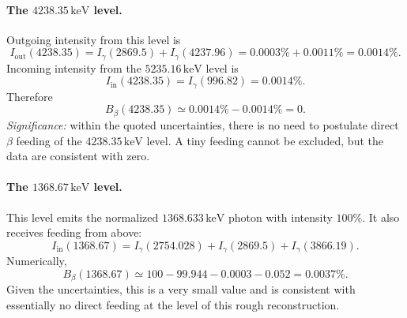 \paragraph{The $4238.35\,\text{keV}$ level.}
Outgoing intensity from this level is
\begin{equation}
  \label{eq:lec10:out_4238}
  I_\text{out}(4238.35)
  =
  I_\gamma(2869.5)+I_\gamma(4237.96)
  =
  0.0003\%+0.0011\%
  =
  0.0014\%.
\end{equation}
Incoming intensity from the $5235.16\,\text{keV}$ level is
\begin{equation}
  \label{eq:lec10:in_4238}
  I_\text{in}(4238.35)=I_\gamma(996.82)=0.0014\%.
\end{equation}
Therefore
\begin{equation}
  \label{eq:lec10:feed_4238}
  \boxed{
  B_\beta(4238.35)\simeq 0.0014\%-0.0014\%=0.}
\end{equation}
\textit{Significance:} within the quoted uncertainties, there is no need to
postulate direct $\beta$ feeding of the $4238.35\,\text{keV}$ level. A tiny
feeding cannot be excluded, but the data are consistent with zero.

\paragraph{The $1368.67\,\text{keV}$ level.}
This level emits the normalized $1368.633\,\text{keV}$ photon with intensity
$100\%$. It also receives feeding from above:
\begin{equation}
  \label{eq:lec10:in_1368}
  I_\text{in}(1368.67)
  =
  I_\gamma(2754.028)+I_\gamma(2869.5)+I_\gamma(3866.19).
\end{equation}
Numerically,
\begin{equation}
  \label{eq:lec10:feed_1368}
  B_\beta(1368.67)
  \simeq
  100 - 99.944 - 0.0003 - 0.052
  =
  0.0037\%.
\end{equation}
Given the uncertainties, this is a very small value and is consistent with
essentially no direct feeding at the level of this rough reconstruction.

